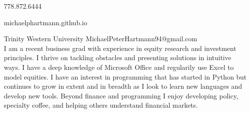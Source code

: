 \documentclass{article}
\begin{document}
\Huge{}
\hfill
\large778.872.6444

\large {}
\hfill
\large michaelphartmann.github.io

\large \noindent Trinity Western University
\hfill
\large MichaelPeterHartmann94@gmail.com\\

\normalsize \noindent I am a recent business grad with experience in equity research and investment principles.
I thrive on tackling obstacles and presenting solutions in intuitive ways.
I have a deep knowledge of Microsoft Office and regularily use Excel to model equities.
I have an interest in programming that has started in Python but continues to grow in extent and
in breadth as I look to learn new languages and develop new tools. Beyond finance and programming
I enjoy developing policy, specialty coffee, and helping others understand financial markets.
\end{document}
